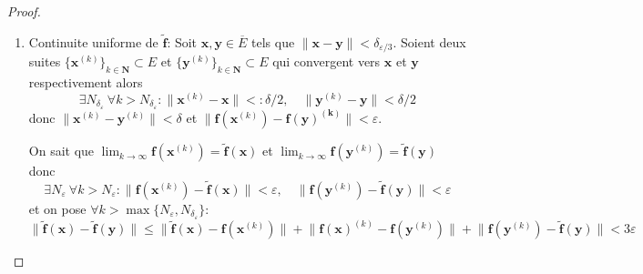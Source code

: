 \begin{proof}
\begin{enumerate}
Ceci montre que $\lim_{ \boldsymbol{x} \to \boldsymbol{a} }\boldsymbol{f}(\boldsymbol{x})$ existe pour tout $\boldsymbol{a}\in \overline{E}\setminus E$ et on peut construire le prolongement par continuite $\boldsymbol{\tilde{f}}$ sur $E$.
\item Continuite uniforme de $\boldsymbol{\tilde{f}}$: Soit $\boldsymbol{x},\boldsymbol{y}\in \overline{E}$ tels que $\lVert \boldsymbol{x}-\boldsymbol{y} \rVert<\delta _{\varepsilon /3}$. Soient deux suites $\{ \boldsymbol{x}^{(k)} \}_{k\in \mathbf{N}}\subset E$ et $\{ \boldsymbol{y}^{(k)} \}_{k\in \mathbf{N}}\subset E$ qui convergent vers $\boldsymbol{x}$ et $\boldsymbol{y}$ respectivement alors
$$
\exists N_{\delta _{\varepsilon}}~\forall k>N_{\delta _{\varepsilon}}:\lVert \boldsymbol{x}^{(k)}-\boldsymbol{x} \rVert<:\delta /2,\quad\lVert \boldsymbol{y}^{(k)}-\boldsymbol{y} \rVert <\delta /2
$$
donc $\lVert \boldsymbol{x}^{(k)}-\boldsymbol{y}^{(k)} \rVert<\delta$ et $\lVert \boldsymbol{f}(\boldsymbol{x}^{(k)})-\boldsymbol{\boldsymbol{f}(\boldsymbol{y})^{(k)}} \rVert<\varepsilon$.

On sait que $\lim_{ k \to \infty }\boldsymbol{f}(\boldsymbol{x}^{(k)})=\boldsymbol{\tilde{f}}(\boldsymbol{x})$ et $\lim_{ k \to \infty }\boldsymbol{f}(\boldsymbol{y}^{(k)})=\boldsymbol{\tilde{f}}(\boldsymbol{y})$ donc 
$$
	\exists N_{\varepsilon}~\forall k>N_{\varepsilon}:\lVert \boldsymbol{f}(\boldsymbol{x}^{(k)})-\boldsymbol{\tilde{f}}(\boldsymbol{x}) \rVert <\varepsilon,\quad \lVert \boldsymbol{f}(\boldsymbol{y}^{(k)})-\boldsymbol{\tilde{f}}(\boldsymbol{y}) \rVert <\varepsilon
$$
et on pose $\forall k>\max\{ N_{\varepsilon},N_{\delta _{\varepsilon}} \}$:
$$
\lVert \boldsymbol{\tilde{f}}(\boldsymbol{x})-\boldsymbol{\tilde{f}}(\boldsymbol{y}) \rVert \le \lVert \boldsymbol{\tilde{f}}(\boldsymbol{x})-\boldsymbol{f}(\boldsymbol{x}^{(k)}) \rVert +\lVert \boldsymbol{f}(\boldsymbol{x})^{(k)}-\boldsymbol{f}(\boldsymbol{y}^{(k)}) \rVert +\lVert \boldsymbol{f}(\boldsymbol{y}^{(k)})-\boldsymbol{\tilde{f}}(\boldsymbol{y}) \rVert <3\varepsilon 
$$
\end{enumerate}
\end{proof}